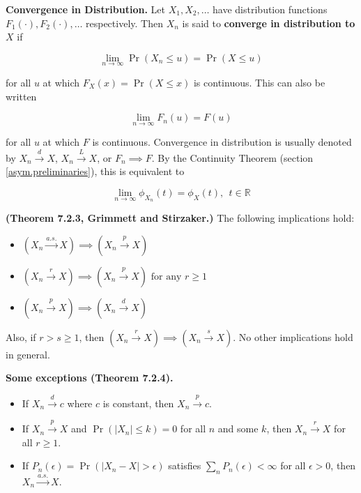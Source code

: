 \begin{definition}
\textbf{Convergence in Distribution.} Let \(X_1, X_2, \ldots\) have distribution functions \(F_1(\cdot), F_2(\cdot), \ldots \) respectively. Then \(X_n\) is said to \textbf{converge in distribution to \(X\)} if

\[
\lim_{n \to \infty} \Pr(X_n \leq u) = \Pr(X \leq u)
\]

for all \(u\) at which \(F_X(x) = \Pr(X \leq x)\) is continuous. This can also be written

\[
\lim_{n \to \infty} F_n(u) = F(u)
\]

for all \(u\) at which \(F\) is continuous. Convergence in distribution is usually denoted by \(X_n \xrightarrow{d} X\), \(X_n \xrightarrow{L} X\), or \(F_n \implies F\). By the Continuity Theorem (section \ref{asym.preliminaries}), this is equivalent to

\[
\lim_{n \to \infty} \phi_{X_n}(t) = \phi_X(t), \ \ t \in \mathbb{R}
\]
\end{definition}

\begin{theorem}
\textbf{(Theorem 7.2.3, Grimmett and Stirzaker.)} The following implications hold:

\begin{itemize}

\item \( (X_n \xrightarrow{a.s.} X) \implies (X_n \xrightarrow{p} X) \)

\item \( (X_n \xrightarrow{r} X) \implies (X_n \xrightarrow{p} X) \text{ for any } r \geq 1 \)

\item \( (X_n \xrightarrow{p} X) \implies (X_n \xrightarrow{d} X) \)

\end{itemize}

Also, if \(r > s \geq 1\), then \((X_n \xrightarrow{r} X) \implies (X_n \xrightarrow{s} X)\). No other implications hold in general.
\end{theorem}

\begin{theorem}\label{asym.7.2.4}\textbf{Some exceptions (Theorem 7.2.4).}

\begin{itemize}

\item If \(X_n \xrightarrow{d} c\) where \(c\) is constant, then \(X_n \xrightarrow{p} c\).

\item If \(X_n \xrightarrow{p} X\) and \(\Pr(|X_n| \leq k) = 0\) for all \(n\) and some \(k\), then \(X_n \xrightarrow{r} X\) for all \(r \geq 1\).

\item If \(P_n(\epsilon) = \Pr(|X_n - X| > \epsilon)\) satisfies \(\sum_n P_n(\epsilon) < \infty\) for all \(\epsilon > 0\), then \(X_n \xrightarrow{a.s.} X\). 

\end{itemize}
\end{theorem}

